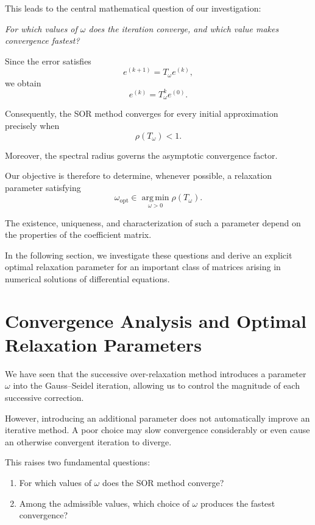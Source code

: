 \documentclass[11pt,a4paper]{article}
\theoremstyle{definition}
\theoremstyle{remark}
\begin{document}
This leads to the central
mathematical question of
our investigation:

\begin{center}
\emph{
For which values of $\omega$
does the iteration converge,
and which value makes
convergence fastest?
}
\end{center}

Since the error satisfies
\[
    e^{(k+1)}
    =
    T_{\omega}e^{(k)},
\]
we obtain
\[
    e^{(k)}
    =
    T_{\omega}^{k}e^{(0)}.
\]

Consequently, the SOR method
converges for every initial
approximation precisely when
\[
    \boxed{
    \rho(T_{\omega})<1.
    }
\]

Moreover, the spectral radius
governs the asymptotic
convergence factor.

Our objective is therefore
to determine, whenever possible,
a relaxation parameter satisfying
\[
    \boxed{
    \omega_{\mathrm{opt}}
    \in
    \operatorname*{arg\,min}_{\omega>0}
    \rho(T_{\omega}).
    }
\]

The existence, uniqueness,
and characterization of such
a parameter depend on the
properties of the coefficient
matrix.

In the following section,
we investigate these questions
and derive an explicit optimal
relaxation parameter for an
important class of matrices
arising in numerical solutions
of differential equations.



\section{Convergence Analysis and Optimal Relaxation Parameters}

We have seen that the successive over-relaxation method
introduces a parameter $\omega$ into the Gauss--Seidel
iteration, allowing us to control the magnitude of each
successive correction.

However, introducing an additional parameter does not
automatically improve an iterative method. A poor choice
may slow convergence considerably or even cause an
otherwise convergent iteration to diverge.

This raises two fundamental questions:

\begin{enumerate}
    \item For which values of $\omega$ does the SOR
    method converge?

    \item Among the admissible values, which choice
    of $\omega$ produces the fastest convergence?
\end{enumerate}
\end{document}
